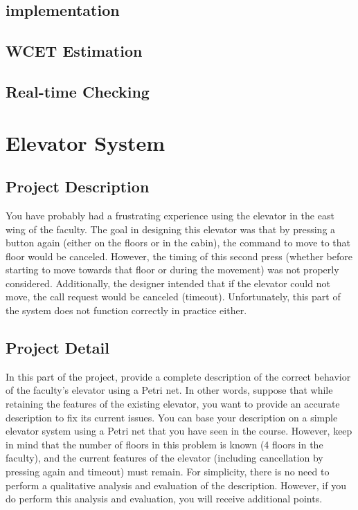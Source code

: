 \documentclass[12pt	]{article}
\begin{document}
\subsection{implementation}
\subsection{WCET Estimation}
\subsection{Real-time Checking}











\newpage

\section{Elevator System}


\subsection{Project Description}
You have probably had a frustrating experience using the elevator in the east wing of the faculty. The goal in designing this elevator was that by pressing a button again (either on the floors or in the cabin), the command to move to that floor would be canceled. However, the timing of this second press (whether before starting to move towards that floor or during the movement) was not properly considered. Additionally, the designer intended that if the elevator could not move, the call request would be canceled (timeout). Unfortunately, this part of the system does not function correctly in practice either.



\subsection{Project Detail}
In this part of the project, provide a complete description of the correct behavior of the faculty's elevator using a Petri net. In other words, suppose that while retaining the features of the existing elevator, you want to provide an accurate description to fix its current issues. You can base your description on a simple elevator system using a Petri net that you have seen in the course. However, keep in mind that the number of floors in this problem is known (4 floors in the faculty), and the current features of the elevator (including cancellation by pressing again and timeout) must remain. For simplicity, there is no need to perform a qualitative analysis and evaluation of the description. However, if you do perform this analysis and evaluation, you will receive additional points.
\end{document}
